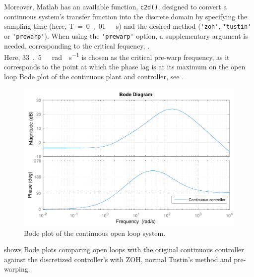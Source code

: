 Moreover, Matlab has an available function, \lstinline[style=custommatlabinline]{c2d()}, designed to convert a continuous system's transfer function into the discrete domain by specifying the sampling time (here, \si{T = 0,01\ s}) and the desired method (\lstinline[style=custommatlabinline]{'zoh'}, \lstinline[style=custommatlabinline]{'tustin'} or \lstinline[style=custommatlabinline]{'prewarp'}). When using the \lstinline[style=custommatlabinline]{'prewarp'} option, a supplementary argument is needed, corresponding to the critical fequency, \cite{Matlabc2d}.\\
Here, \si{33,5\ rad \cdot s^{-1}} is chosen as the critical pre-warp frequency, as it corresponds to the point at which the phase lag is at its maximum on the open loop Bode plot of the continuous plant and controller, see .
%
\begin{figure}[H]
  \centering
  \includegraphics[scale=0.6]{figures/openLoopBadSISOController}
  \caption{Bode plot of the continuous open loop system.}
  \label{fig:bodeOpenLoopContinuous}
\end{figure}
%
 shows Bode plots comparing open loops with the original continuous controller against the discretized controller's with ZOH, normal Tustin's method and pre-warping.
%
